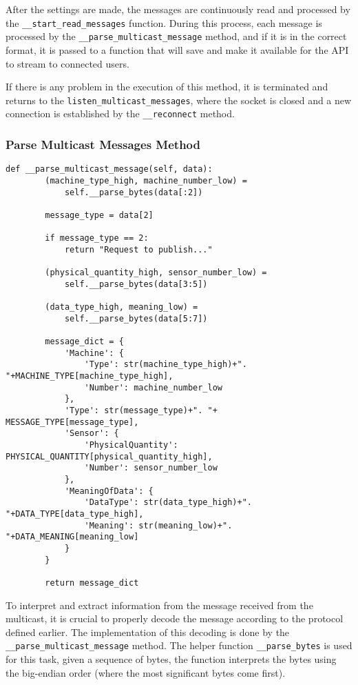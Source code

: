 After the settings are made, the messages are continuously read and processed by the \texttt{\_\_start\_read\_messages} function. During this process, each message is processed by the \texttt{\_\_parse\_multicast\_message} method, and if it is in the correct format, it is passed to a function that will save and make it available for the \gls{API} to stream to connected users.

If there is any problem in the execution of this method, it is terminated and returns to the \texttt{listen\_multicast\_messages}, where the socket is closed and a new connection is established by the \texttt{\_\_reconnect} method.

\subsubsection[Parse Multicast Messages Method]{Parse Multicast Messages Method}

\begin{verbatim}
def __parse_multicast_message(self, data):
        (machine_type_high, machine_number_low) = 
            self.__parse_bytes(data[:2])

        message_type = data[2]

        if message_type == 2:
            return "Request to publish..."

        (physical_quantity_high, sensor_number_low) = 
            self.__parse_bytes(data[3:5])
        
        (data_type_high, meaning_low) = 
            self.__parse_bytes(data[5:7])

        message_dict = {
            'Machine': {
                'Type': str(machine_type_high)+". "+MACHINE_TYPE[machine_type_high],
                'Number': machine_number_low
            },
            'Type': str(message_type)+". "+ MESSAGE_TYPE[message_type],
            'Sensor': {
                'PhysicalQuantity': PHYSICAL_QUANTITY[physical_quantity_high],
                'Number': sensor_number_low
            },
            'MeaningOfData': {
                'DataType': str(data_type_high)+". "+DATA_TYPE[data_type_high],
                'Meaning': str(meaning_low)+". "+DATA_MEANING[meaning_low]
            }
        }

        return message_dict
\end{verbatim}

To interpret and extract information from the message received from the multicast, it is crucial to properly decode the message according to the protocol defined earlier. The implementation of this decoding is done by the \texttt{\_\_parse\_multicast\_message} method. The helper function \texttt{\_\_parse\_bytes} is used for this task, given a sequence of bytes, the function interprets the bytes using the big-endian order (where the most significant bytes come first).


